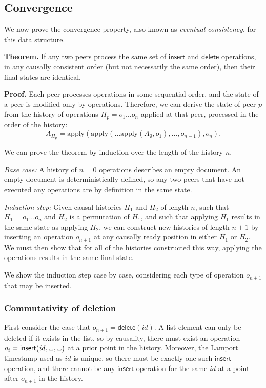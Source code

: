 \documentclass[a4paper,twocolumn,10pt]{article}
\newcommand{\placeholder}{%
  \makebox[0.7em]{%
    \kern.07em
    \vrule height.3ex
    \hrulefill
    \vrule height.3ex
    \kern.07em
  }%
}
\begin{document}
\subsection{Convergence}

We now prove the convergence property, also known as \emph{eventual consistency}, for this data structure.

\textbf{Theorem.} If any two peers process the same set of $\mathsf{insert}$ and $\mathsf{delete}$ operations, in any causally consistent order (but not necessarily the same order), then their final states are identical.

\textbf{Proof.} Each peer processes operations in some sequential order, and the state of a peer is modified only by operations. Therefore, we can derive the state of peer $p$ from the history of operations $H_p=o_1 \dots o_n$ applied at that peer, processed in the order of the history:
$$ A_{H_p} = \mathrm{apply}(\mathrm{apply}(\dots \mathrm{apply}(A_\emptyset, o_1), \dots, o_{n-1}), o_n). $$

We can prove the theorem by induction over the length of the history $n$.

\emph{Base case:} A history of $n=0$ operations describes an empty document. An empty document is deterministically defined, so any two peers that have not executed any operations are by definition in the same state.

\emph{Induction step:} Given causal histories $H_1$ and $H_2$ of length $n$, such that $H_1=o_1 \dots o_n$ and $H_2$ is a permutation of $H_1$, and such that applying $H_1$ results in the same state as applying $H_2$, we can construct new histories of length $n+1$ by inserting an operation $o_{n+1}$ at any causally ready position in either $H_1$ or $H_2$. We must then show that for all of the histories constructed this way, applying the operations results in the same final state.

We show the induction step case by case, considering each type of operation $o_{n+1}$ that may be inserted.

\subsubsection{Commutativity of deletion}

First consider the case that $o_{n+1}=\mathsf{delete}(\mathit{id})$. A list element can only be deleted if it exists in the list, so by causality, there must exist an operation $o_i=\mathsf{insert}(\mathit{id}, \placeholder, \placeholder)$ at a prior point in the history. Moreover, the Lamport timestamp used as $\mathit{id}$ is unique, so there must be exactly one such $\mathsf{insert}$ operation, and there cannot be any $\mathsf{insert}$ operation for the same $\mathit{id}$ at a point after $o_{n+1}$ in the history.
\end{document}
